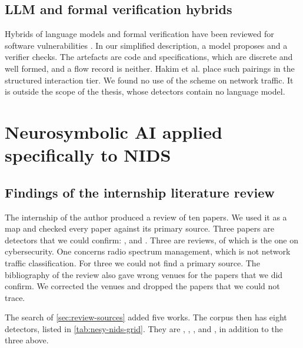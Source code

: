 \subsection{LLM and formal verification hybrids}
\label{sec:nesy-llm-formal}

Hybrids of language models and formal verification have been reviewed for
software vulnerabilities \citep{tihanyi2025vulnerability}. In our simplified
description, a model proposes and a verifier checks. The artefacts are code and specifications, which are discrete
and well formed, and a flow record is neither. Hakim et al. place such pairings
in the structured interaction tier. We found no use of the scheme on network
traffic. It is outside the scope of the thesis, whose detectors contain no
language model.

\section{Neurosymbolic AI applied specifically to NIDS}
\label{sec:nesy-nids}

\subsection{Findings of the internship literature review}
\label{sec:internship-findings}

The internship of the author produced a review of ten papers. We used it as a
map and checked every paper against its primary source. Three papers are
detectors that we could confirm: \citet{onchis2022neurosymbolic},
\citet{bizzarri2024nsaids} and \citet{kalutharage2025neurosymbolic}. Three are
reviews, of which \citet{hakim2025nesycybersecurity} is the one on
cybersecurity. One concerns radio spectrum management, which is not network
traffic classification. For three we could not find a primary source. The
bibliography of the review also gave wrong venues for the papers that we did
confirm. We corrected the venues and dropped the papers that we could not trace.

The search of \cref{sec:review-sources} added five works. The corpus then has
eight detectors, listed in \cref{tab:nesy-nids-grid}. They are
\citet{tran2025odxu}, \citet{tran2025transfer}, \citet{aresrobledo2025hyperparameter},
\citet{zhou2024knowgraph} and \citet{alemayehu2026deployment}, in addition to the
three above.

